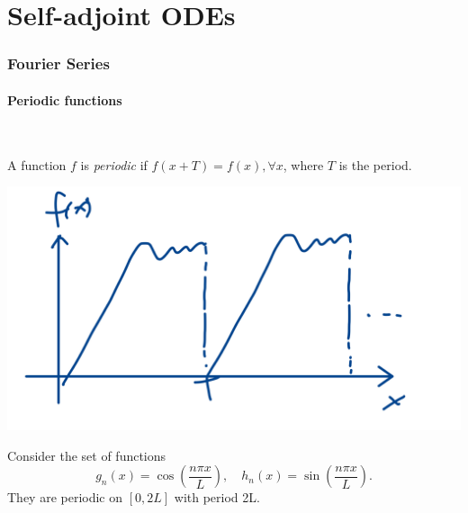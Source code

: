 \documentclass[a4paper]{article}
\begin{document}
\maketitle
\tableofcontents
\clearpage
\part{Self-adjoint ODEs}
\section{Fourier Series}
\subsection{Periodic functions}\ \vspace{-1.5em}
\begin{definition}
    A function $f$ is \textit{periodic} if $ f(x+T)=f(x), \forall x $, where $T$ is the period.
\end{definition}
\begin{center}
    \includegraphics[scale=0.1]{methods1.jpeg}
\end{center}
Consider the set of functions 
\[
    g_n(x) = \cos \left( \frac{n\pi x}{L} \right),\quad h_n(x) = \sin \left( \frac{n\pi x}{L} \right).
\]
They are periodic on $ [0,2L] $ with period 2L.
\end{document}
